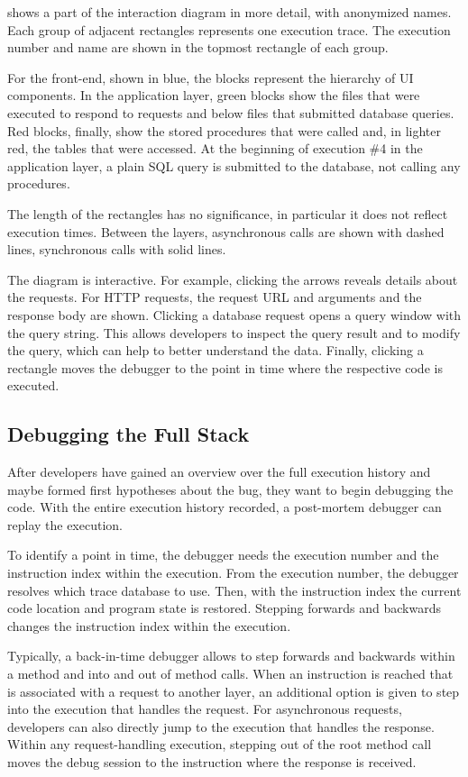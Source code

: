 \documentclass[
      english,
			conference,
      ]{IEEEtran}
\begin{document}
 shows a part of the interaction diagram in more detail, with anonymized names.
Each group of adjacent rectangles represents one execution trace.
The execution number and name are shown in the topmost rectangle of each group.

For the front-end, shown in blue, the blocks represent the hierarchy of UI components.
In the application layer, green blocks show the files that were executed to respond to requests and below files that submitted database queries.
Red blocks, finally, show the stored procedures that were called and, in lighter red, the tables that were accessed.
At the beginning of execution \#4 in the application layer, a plain SQL query is submitted to the database, not calling any procedures.

The length of the rectangles has no significance, in particular it does not reflect execution times.
Between the layers, asynchronous calls are shown with dashed lines, synchronous calls with solid lines.

The diagram is interactive.
For example, clicking the arrows reveals details about the requests.
For HTTP requests, the request URL and arguments and the response body are shown.
Clicking a database request opens a query window with the query string.
This allows developers to inspect the query result and to modify the query, which can help to better understand the data.
Finally, clicking a rectangle moves the debugger to the point in time where the respective code is executed.

\subsection{Debugging the Full Stack}

After developers have gained an overview over the full execution history and maybe formed first hypotheses about the bug, they want to begin debugging the code.
With the entire execution history recorded, a post-mortem debugger can replay the execution.

To identify a point in time, the debugger needs the execution number and the instruction index within the execution.
From the execution number, the debugger resolves which trace database to use.
Then, with the instruction index the current code location and program state is restored.
Stepping forwards and backwards changes the instruction index within the execution.

Typically, a back-in-time debugger allows to step forwards and backwards within a method and into and out of method calls.
When an instruction is reached that is associated with a request to another layer, 
an additional option is given to step into the execution that handles the request.
For asynchronous requests, developers can also directly jump to the execution that handles the response.
Within any request-handling execution, stepping out of the root method call moves the debug session to the instruction where the response is received.
\end{document}
